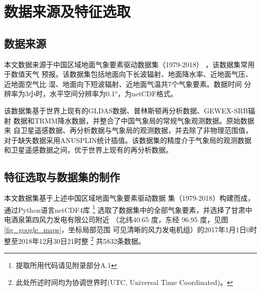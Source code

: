 \documentclass[AutoFakeBold]{LZUThesis}
\begin{document}



\chapter{数据来源及特征选取}
\section{数据来源}
本文数据来源于中国区域地面气象要素驱动数据集（1979-2018）
，该数据集常用于数值天气
预报。该数据集包括地面向下长波辐射、地面降水率、近地面气压、近地面空气比
湿、地面向下短波辐射、近地面气温共7个气象要素。数据时间
分辨率为3小时，水平空间分辨率为0.1°，为netCDF格式。

该数据集基于世界上现有的GLDAS数据、普林斯顿再分析数据、GEWEX-SRB辐射
数据和TRMM降水数据，并整合了中国气象局的常规气象观测数据。原始数据来
自卫星遥感数据、再分析数据与气象局的观测数据，并去除了非物理范围值，
对于缺失数据采用ANUSPLIN统计插值。该数据集的精度介于气象局的观测数据
和卫星遥感数据之间，优于世界上现有的再分析数据。

\section{特征选取与数据集的制作}
本文数据集基于上述中国区域地面气象要素驱动数据
集（1979-2018）构建而成，通过Python语言netCDF4库
\footnote{提取所用代码请见附录部分A.1}
选取了数据集中的全部气象要素，并选择了甘肃中电酒泉第四风力发电有限公司附近
（北纬40.65 度，东经 96.95 度，见图\ref{fig_google_maps}，坐标局部范围
可见清晰的风力发电机组）的2017年1月1日0时整至2018年12月30日21时整
\footnote{此处所述时间均为协调世界时(UTC, Universal Time Coordinated)。}
共5832条数据。
\end{document}
